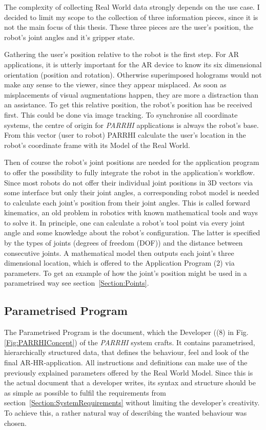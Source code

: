 The complexity of collecting Real World data strongly depends on the use case. I decided to limit my scope to the collection of three information pieces, since it is not the main focus of this thesis. These three pieces are the user's position, the robot's joint angles and it's gripper state. 

Gathering the user's position relative to the robot is the first step. For AR applications, it is utterly important for the AR device to know its six dimensional orientation (position and rotation). Otherwise superimposed holograms would not make any sense to the viewer, since they appear misplaced. As soon as misplacements of visual augmentations happen, they are more a distraction than an assistance. To get this relative position, the robot's position has be received first. This could be done via image tracking. To synchronise all coordinate systems, the centre of origin for \textit{PARRHI} applications is always the robot's base. From this vector (user to robot) PARRHI calculate the user's location in the robot's coordinate frame with its Model of the Real World.

Then of course the robot's joint positions are needed for the application program to offer the possibility to fully integrate the robot in the application's workflow. Since most robots do not offer their individual joint positions in 3D vectors via some interface but only their joint angles, a corresponding robot model is needed to calculate each joint's position from their joint angles. This is called forward kinematics, an old problem in robotics with known mathematical tools and ways to solve it. In principle, one can calculate a robot's tool point via every joint angle and some knowledge about the robot's configuration. The latter is specified by the types of joints (degrees of freedom (DOF)) and the distance between consecutive joints. A mathematical model then outputs each joint's three dimensional location, which is offered to the Application Program (2) via parameters. To get an example of how the joint's position might be used in a parametrised way see section~\ref{Section:Points}.

\subsection{Parametrised Program}
\label{Section:ParametrisedProgram}
The Parametrised Program is the document, which the Developer ((8) in Fig. \ref{Fig:PARRHIConcept}) of the \textit{PARRHI} system crafts. It contains parametrised, hierarchically structured data, that defines the behaviour, feel and look of the final AR-HR-application. All instructions and definitions can make use of the previously explained parameters offered by the Real World Model. Since this is the actual document that a developer writes, its syntax and structure should be as simple as possible to fulfil the requirements from section~\ref{Section:SystemRequirements} without limiting the developer's creativity. To achieve this, a rather natural way of describing the wanted behaviour was chosen. 

